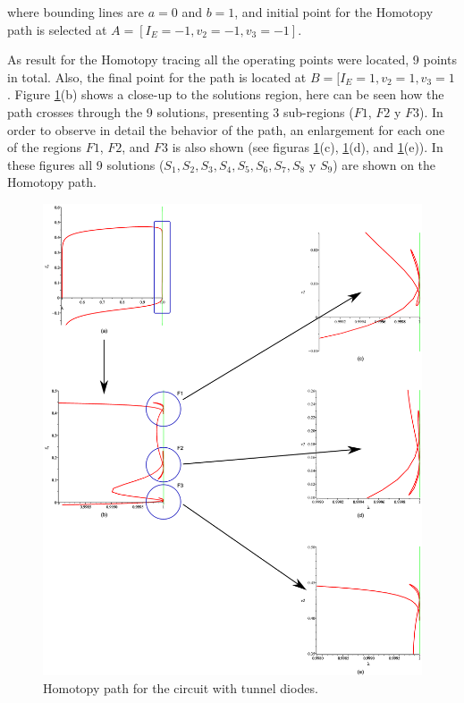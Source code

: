 \documentclass[conference,letterpaper,onecolumn]{IEEEtran}
\begin{document}
{where bounding lines are $a=0$ and $b=1$, and initial point for the Homotopy path is selected at $A=[I_E=-1,v_2=-1,v_3=-1]$.

As result for the Homotopy tracing all the operating points were located, 9 points in total. Also, the final point for the path is located at $B=[I_E=1,v_2=1,v_3=1$. Figure \ref{2tunelg}(b) shows a close-up to the solutions region, here can be seen how the path crosses through the 9 solutions, presenting 3 sub-regions ($F1$, $F2$ y $F3$). In order to observe in detail the behavior of the path, an enlargement for each one of the regions $F1$, $F2$, and $F3$ is also shown (see
figuras \ref{2tunelg}(c), \ref{2tunelg}(d), and \ref{2tunelg}(e)). In these figures all 9 solutions ($S_1, S_2, S_3, S_4, S_5, S_6, S_7, S_8$ y $S_9$) are shown on the Homotopy path.

\begin{figure}[hbtp]
\centering
\includegraphics[scale=0.25]{ejem4lim/TUNEL_COMPLETE.eps}
\caption{Homotopy path for the circuit with tunnel diodes.}
\label{2tunelg}
\end{figure}

}
\end{document}
